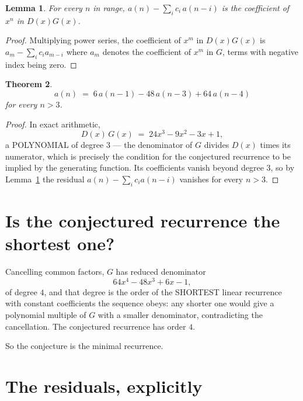 \documentclass[11pt,a4paper]{article}
\theoremstyle{plain}
\newtheorem{theorem}{Theorem}
\newtheorem{lemma}[theorem]{Lemma}
\theoremstyle{definition}
\begin{document}
\begin{lemma}\label{lem:key}
For every $n$ in range, $a(n)-\sum_i c_i\,a(n-i)$ is the coefficient of $x^{n}$ in
$D(x)G(x)$.
\end{lemma}

\begin{proof}
Multiplying power series, the coefficient of $x^{m}$ in $D(x)G(x)$ is
$a_m-\sum_i c_i a_{m-i}$ where $a_m$ denotes the coefficient of $x^{m}$ in $G$, terms with
negative index being zero.
\end{proof}

\begin{theorem}
\[
a(n)\;=\;6\,a(n-1) - 48\,a(n-3) + 64\,a(n-4)
\]
for every $n>3$.
\end{theorem}

\begin{proof}
In exact arithmetic,
\[
D(x)\,G(x)\;=\;24 x^{3} - 9 x^{2} - 3 x + 1,
\]
a POLYNOMIAL of degree $3$ --- the denominator of $G$ divides $D(x)$ times its numerator,
which is precisely the condition for the conjectured recurrence to be implied by the
generating function. Its coefficients vanish beyond degree $3$, so by
Lemma~\ref{lem:key} the residual $a(n)-\sum_ic_ia(n-i)$ vanishes for every
$n>3$.
\end{proof}

\section{Is the conjectured recurrence the shortest one?}

Cancelling common factors, $G$ has reduced denominator
\[
64 x^{4} - 48 x^{3} + 6 x - 1,
\]
of degree $4$, and that degree is the order of the SHORTEST linear recurrence with
constant coefficients the sequence obeys: any shorter one would give a polynomial multiple of
$G$ with a smaller denominator, contradicting the cancellation. The conjectured recurrence has
order $4$.

So the conjecture is the minimal recurrence.

\section{The residuals, explicitly}
\end{document}
